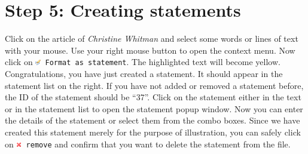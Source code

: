 \documentclass[12pt,a4paper]{scrreprt}
\newcommand{\code}[1]{\texttt{#1}}
\begin{document}
\section*{Step 5: Creating statements}
Click on the article of \emph{Christine Whitman} and select some words or lines of text with your mouse. Use your right mouse button to open the context menu. Now click on \code{\includegraphics[height=9px]{icons-edit.png} Format as statement}. The highlighted text will become yellow. Congratulations, you have just created a statement. It should appear in the statement list on the right. If you have not added or removed a statement before, the ID of the statement should be ``37''. Click on the statement either in the text or in the statement list to open the statement popup window. Now you can enter the details of the statement or select them from the combo boxes. Since we have created this statement merely for the purpose of illustration, you can safely click on \code{\includegraphics[height=9px]{icons-remove.png} remove} and confirm that you want to delete the statement from the file.
 
\end{document}
